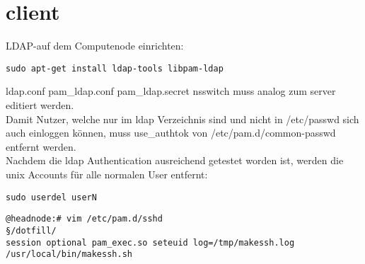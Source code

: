 \section{client}
LDAP-auf dem Computenode einrichten:
\begin{lstlisting}[style=Bash]
sudo apt-get install ldap-tools libpam-ldap
\end{lstlisting}
{ldap.conf pam\_ldap.conf pam\_ldap.secret nsswitch} muss analog zum server editiert werden.\\
Damit Nutzer, welche nur im ldap Verzeichnis sind und nicht in /etc/passwd sich auch einloggen können, muss use\_authtok von /etc/pam.d/common-passwd entfernt werden.\\
Nachdem die ldap Authentication ausreichend getestet worden ist, werden die unix Accounts für alle normalen User entfernt: 
\begin{lstlisting}[style=Bash]
sudo userdel userN
\end{lstlisting}
\begin{lstlisting}[style=Bash]
@headnode:# vim /etc/pam.d/sshd
§/dotfill/
session optional pam_exec.so seteuid log=/tmp/makessh.log /usr/local/bin/makessh.sh
\end{lstlisting}
